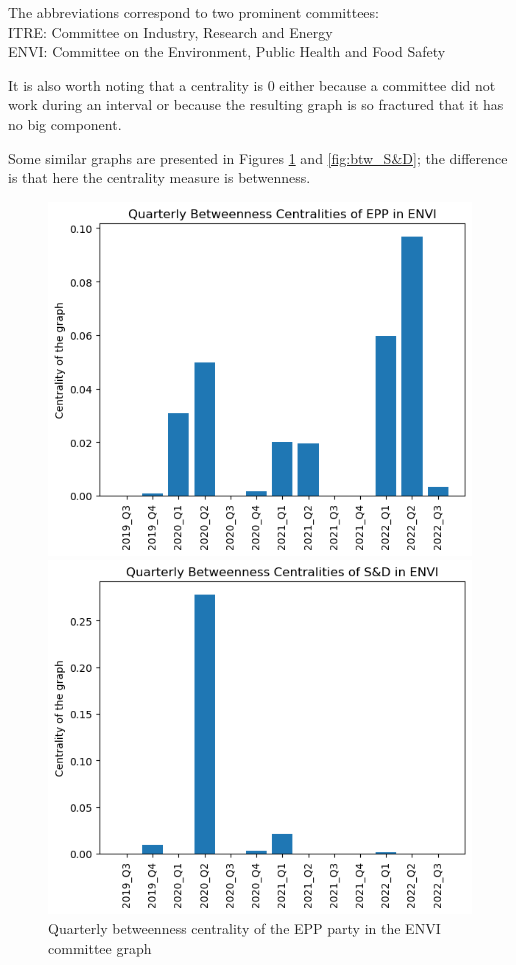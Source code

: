 \documentclass[lettersize,journal]{IEEEtran}
\begin{document}
The abbreviations correspond to two prominent committees:\\
ITRE: Committee on Industry, Research and Energy\\
ENVI: Committee on the Environment, Public Health and Food Safety

It is also worth noting that a centrality is 0 either because a committee did not work during an interval or because the resulting graph is so fractured that it has no big component.

Some similar graphs are presented in Figures \ref{fig:btw_EPP} and \ref{fig:btw_S&D}; the difference is that here the centrality measure is betwenness.

\begin{figure}[h]
  \centering
  \begin{minipage}[b]{0.23\textwidth}
    \includegraphics[width=\textwidth]{EPP_ENVI_Q_betweenness.png}
    \caption{Quarterly betweenness centrality of the EPP party in the ENVI committee graph}
    \label{fig:btw_EPP}
  \end{minipage}
  \hfill
  \begin{minipage}[b]{0.23\textwidth}
    \includegraphics[width=\textwidth]{S&D_ENVI_Q_betweenness.png}

\end{minipage}
\end{figure}
\end{document}

